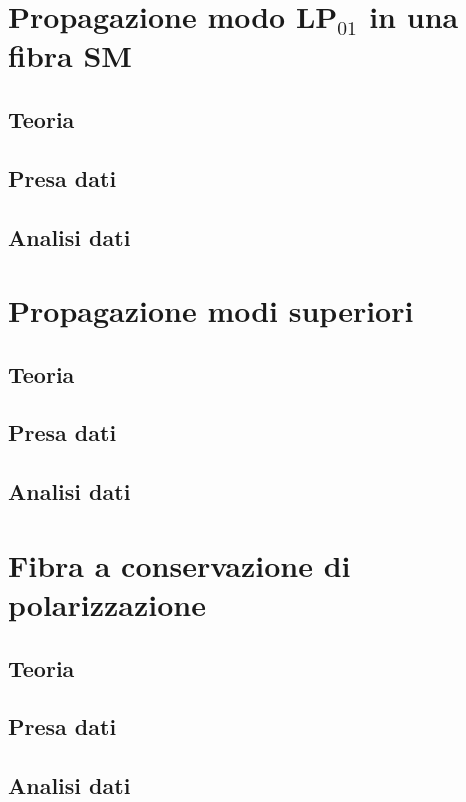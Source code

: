 \documentclass[a4paper]{article}
\begin{document}
\section{Propagazione modo LP$_{01}$ in una fibra SM}

\subsection{Teoria}

\subsection{Presa dati}

\subsection{Analisi dati}

\section{Propagazione modi superiori}

\subsection{Teoria}

\subsection{Presa dati}

\subsection{Analisi dati}

\section{Fibra a conservazione di polarizzazione}

\subsection{Teoria}

\subsection{Presa dati}

\subsection{Analisi dati}
\end{document}
